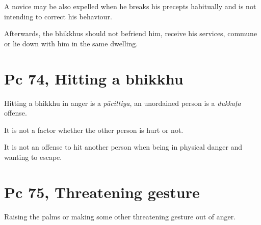A novice may be also expelled when he breaks his precepts habitually and
is not intending to correct his behaviour.

Afterwards, the bhikkhus should not befriend him, receive his services,
commune or lie down with him in the same dwelling.

\section{Pc 74, Hitting a bhikkhu}

Hitting a bhikkhu in anger is a \emph{pācittiya}, an unordained person
is a \emph{dukkaṭa} offense.

It is not a factor whether the other person is hurt or not.

It is not an offense to hit another person when being in physical danger
and wanting to escape.

\section{Pc 75, Threatening gesture}

Raising the palms or making some other threatening gesture out of anger.

